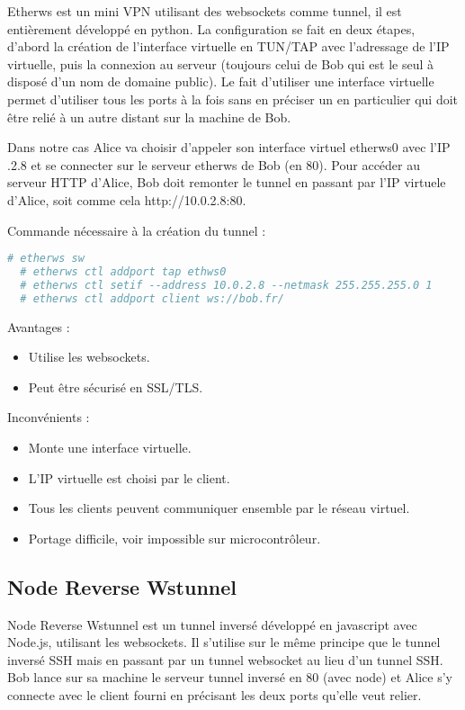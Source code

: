 Etherws est un mini VPN utilisant des websockets comme tunnel, il est entièrement développé en python. La configuration se fait en deux étapes, d'abord la création de l'interface virtuelle en TUN/TAP avec l'adressage de l'IP virtuelle, puis la connexion au serveur (toujours celui de Bob qui est le seul à disposé d'un nom de domaine public). Le fait d'utiliser une interface virtuelle permet d'utiliser tous les ports à la fois sans en préciser un en particulier qui doit être relié à un autre distant sur la machine de Bob.

Dans notre cas Alice va choisir d'appeler son interface virtuel \og etherws0 \fg{} avec l'IP .2.8 \fg{} et se connecter sur le serveur etherws de Bob (en 80). Pour accéder au serveur HTTP d'Alice, Bob doit remonter le tunnel en passant par l'IP virtuele d'Alice, soit comme cela http://10.0.2.8:80.

\noindent Commande nécessaire à la création du tunnel :
\begin{lstlisting}[language=bash]
  # etherws sw
  # etherws ctl addport tap ethws0
  # etherws ctl setif --address 10.0.2.8 --netmask 255.255.255.0 1
  # etherws ctl addport client ws://bob.fr/
\end{lstlisting}

Avantages :
\begin{itemize}
    \item Utilise les websockets.
    \item Peut être sécurisé en SSL/TLS.
\end{itemize}

Inconvénients :
\begin{itemize}
    \item Monte une interface virtuelle.
    \item L'IP virtuelle est choisi par le client.
    \item Tous les clients peuvent communiquer ensemble par le réseau virtuel.
    \item Portage difficile, voir impossible sur microcontrôleur.
\end{itemize}

\subsection{Node Reverse Wstunnel}

Node Reverse Wstunnel est un tunnel inversé développé en javascript avec Node.js, utilisant les websockets. Il s'utilise sur le même principe que le tunnel inversé SSH mais en passant par un tunnel websocket au lieu d'un tunnel SSH. Bob lance sur sa machine le serveur tunnel inversé en 80 (avec node) et Alice s'y connecte avec le client fourni en précisant les deux ports qu'elle veut relier.

